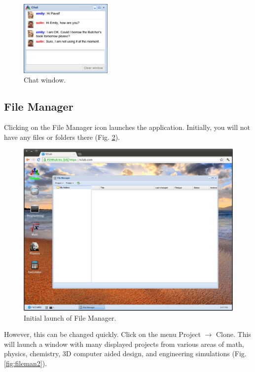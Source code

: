 \documentclass[article,A4,12pt]{llncs}
\begin{document}
\begin{figure}[!ht]
\begin{center}
\includegraphics[width=0.4\textwidth]{img/chat.png}
\end{center}
\caption{Chat window.}
\label{fig:chat}
\end{figure}

\subsection{File Manager}

Clicking on the File Manager icon launches the application. Initially, you will not 
have any files or folders there (Fig. \ref{fig:fileman}).

\begin{figure}[!ht]
\begin{center}
\includegraphics[width=\textwidth]{img/fileman1.png}
\end{center}
\caption{Initial launch of File Manager.}
\label{fig:fileman}
\end{figure}
\noindent
However, this can be changed quickly. Click on the menu Project $\rightarrow$ Clone. This will
launch a window with many displayed projects from various areas of math, 
physics, chemistry, 3D computer aided design, and engineering simulations (Fig. \ref{fig:fileman2}).
\end{document}
